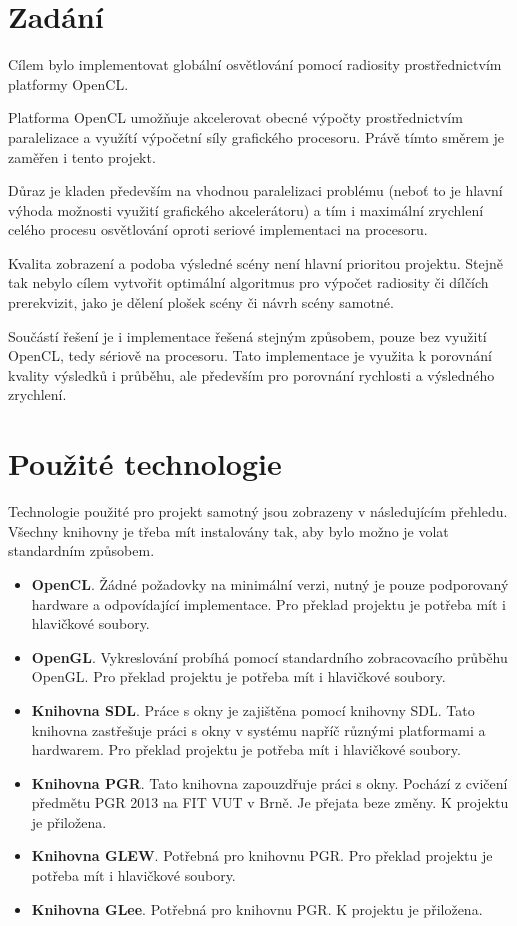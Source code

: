 \documentclass[11pt,a4paper]{article}
\begin{document}
\titlepageandcontents

\section{Zadání}
Cílem bylo implementovat globální osvětlování pomocí radiosity prostřednictvím platformy OpenCL.

Platforma OpenCL umožňuje akcelerovat obecné výpočty prostřednictvím paralelizace a využítí výpočetní síly grafického procesoru. Právě tímto směrem je zaměřen i tento projekt.

Důraz je kladen především na vhodnou paralelizaci problému (neboť to je hlavní výhoda možnosti využití grafického akcelerátoru) a tím i maximální zrychlení celého procesu osvětlování oproti seriové implementaci na procesoru.

Kvalita zobrazení a podoba výsledné scény není hlavní prioritou projektu. Stejně tak nebylo cílem vytvořit optimální algoritmus pro výpočet radiosity či dílčích prerekvizit, jako je dělení plošek scény či návrh scény samotné.

Součástí řešení je i implementace řešená stejným způsobem, pouze bez využití OpenCL, tedy sériově na procesoru. Tato implementace je využita k porovnání kvality výsledků i průběhu, ale především pro porovnání rychlosti a výsledného zrychlení.

\section{Použité technologie}
Technologie použité pro projekt samotný jsou zobrazeny v následujícím přehledu. Všechny knihovny je třeba mít instalovány tak, aby bylo možno je volat standardním způsobem.
\begin{itemize}
  \item \textbf{OpenCL}. Žádné požadovky na minimální verzi, nutný je pouze podporovaný hardware a  odpovídající implementace. Pro překlad projektu je potřeba mít i hlavičkové soubory.
  \item \textbf{OpenGL}. Vykreslování probíhá pomocí standardního zobracovacího průběhu OpenGL. Pro překlad projektu je potřeba mít i hlavičkové soubory.
  \item \textbf{Knihovna SDL}. Práce s okny je zajištěna pomocí knihovny SDL. Tato knihovna zastřešuje práci s okny v systému napříč různými platformami a hardwarem. Pro překlad projektu je potřeba mít i hlavičkové soubory.
  \item \textbf{Knihovna PGR}. Tato knihovna zapouzdřuje práci s okny. Pochází z cvičení předmětu PGR 2013 na FIT VUT v Brně. Je přejata beze změny. K projektu je přiložena.
  \item \textbf{Knihovna GLEW}. Potřebná pro knihovnu PGR. Pro překlad projektu je potřeba mít i hlavičkové soubory.
  \item \textbf{Knihovna GLee}. Potřebná pro knihovnu PGR. K projektu je přiložena.
\end{itemize}
\end{document}
